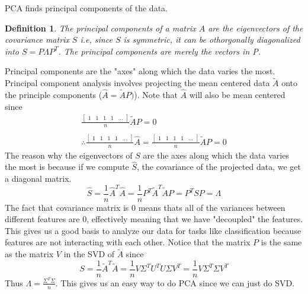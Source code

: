 \documentclass{article}
\newtheorem{definition}{Definition}
\begin{document}
PCA finds principal components of the data.
\begin{definition}
    The principal components of a matrix $A$ are the eigenvectors of the covariance matrix $S$
    i.e, since $S$ is symmetric, it can be othorgonally diagonalized into $S = P\Lambda P^T$.
    The principal components are merely the vectors in P.
\end{definition}
Principal components are the "axes" along which the data varies the most.
Principal component analysis involves projecting the mean centered data $\tilde{A}$ onto the principle components ($\hat{A}=\tilde{A}P)$).
Note that $\hat{A}$ will also be mean centered since
\[
    \begin{array}{c}
        \frac{\left[
        \begin{array}{ccccc}
            1 & 1 & 1 & 1 & ...
        \end{array}
    \right]}{n} \tilde{A}P = 0 \\\\
    \therefore \frac{\left[
        \begin{array}{ccccc}
            1 & 1 & 1 & 1 & ...
        \end{array}
    \right]}{n} \hat{A} = \frac{\left[
        \begin{array}{ccccc}
            1 & 1 & 1 & 1 & ...
        \end{array}
    \right]}{n} \tilde{A}P = 0
    \end{array}
\]
The reason why the eigenvectors of $S$ are the axes along which the data varies the most is because 
if we compute $\hat{S}$, the covariance of the projected data, we get a diagonal matrix.
$$\hat{S}=\frac{1}{n}\hat{A}^T\hat{A} = \frac{1}{n}P^T\tilde{A}^T\tilde{A}P=P^TSP=\Lambda$$
The fact that covariance matrix is 0 means thats all of the variances between different features are 0,
effectively meaning that we have "decoupled" the features.
This gives us a good basis to analyze our data for tasks like classification because features are not interacting with each other.
Notice that the matrix $P$ is the same as the matrix $V$ in the SVD of $\tilde{A}$ since 
$$S=\frac{1}{n}\tilde{A}^T\tilde{A} = \frac{1}{n}V\Sigma^TU^TU\Sigma V^T = \frac{1}{n}V\Sigma^T\Sigma V^T$$
Thus $\Lambda = \frac{\Sigma^T \Sigma}{n}$. This gives us an easy way to do PCA since we can just do SVD.
\end{document}
